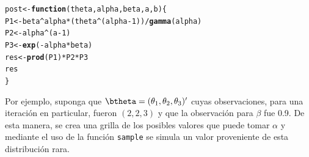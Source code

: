 \documentclass[10pt,openright]{book}\usepackage[]{graphicx}\usepackage[]{color}
\makeatletter
\newcommand{\hlnum}[1]{\textcolor[rgb]{0.686,0.059,0.569}{#1}}%
\newcommand{\hlopt}[1]{\textcolor[rgb]{0,0,0}{#1}}%
\newcommand{\hlstd}[1]{\textcolor[rgb]{0.345,0.345,0.345}{#1}}%
\newcommand{\hlkwa}[1]{\textcolor[rgb]{0.161,0.373,0.58}{\textbf{#1}}}%
\newcommand{\hlkwb}[1]{\textcolor[rgb]{0.69,0.353,0.396}{#1}}%
\newcommand{\hlkwc}[1]{\textcolor[rgb]{0.333,0.667,0.333}{#1}}%
\newcommand{\hlkwd}[1]{\textcolor[rgb]{0.737,0.353,0.396}{\textbf{#1}}}%
\newenvironment{kframe}{%
 \def\at@end@of@kframe{}%
 \ifinner\ifhmode%
  \def\at@end@of@kframe{\end{minipage}}%
  \begin{minipage}{\columnwidth}%
 \fi\fi%
 \def\FrameCommand##1{\hskip\@totalleftmargin \hskip-\fboxsep
 \colorbox{shadecolor}{##1}\hskip-\fboxsep
     \hskip-\linewidth \hskip-\@totalleftmargin \hskip\columnwidth}%
 \MakeFramed {\advance\hsize-\width
   \@totalleftmargin\z@ \linewidth\hsize
   \@setminipage}}%
 {\par\unskip\endMakeFramed%
 \at@end@of@kframe}
\newenvironment{knitrout}{}{} %
\makeatother
\begin{document}
\begin{knitrout}
\color{fgcolor}\begin{kframe}
\begin{alltt}
 \hlstd{post} \hlkwb{<-} \hlkwa{function}\hlstd{(}\hlkwc{theta}\hlstd{,} \hlkwc{alpha}\hlstd{,} \hlkwc{beta}\hlstd{,} \hlkwc{a}\hlstd{,} \hlkwc{b}\hlstd{)\{}
   \hlstd{P1} \hlkwb{<-} \hlstd{beta}\hlopt{^}\hlstd{alpha} \hlopt{*} \hlstd{(theta}\hlopt{^}\hlstd{(alpha}\hlopt{-}\hlnum{1}\hlstd{))} \hlopt{/} \hlkwd{gamma}\hlstd{(alpha)}
   \hlstd{P2} \hlkwb{<-} \hlstd{alpha}\hlopt{^}\hlstd{(a}\hlopt{-}\hlnum{1}\hlstd{)}
   \hlstd{P3} \hlkwb{<-}  \hlkwd{exp}\hlstd{(}\hlopt{-}\hlstd{alpha}\hlopt{*}\hlstd{beta)}
   \hlstd{res} \hlkwb{<-} \hlkwd{prod}\hlstd{(P1)}\hlopt{*}\hlstd{P2}\hlopt{*}\hlstd{P3}
   \hlstd{res}
 \hlstd{\}}
\end{alltt}
\end{kframe}
\end{knitrout}

Por ejemplo, suponga que $\btheta=(\theta_1, \theta_2, \theta_3)'$ cuyas observaciones, para una iteraci\'on en particular, fueron $(2, 2, 3)$ y que la observaci\'on para $\beta$ fue 0.9. De esta manera, se crea una grilla de los posibles valores que puede tomar $\alpha$ y mediante el  uso de la funci\'on \verb'sample' se simula un valor proveniente de esta distribuci\'on rara.
\end{document}
